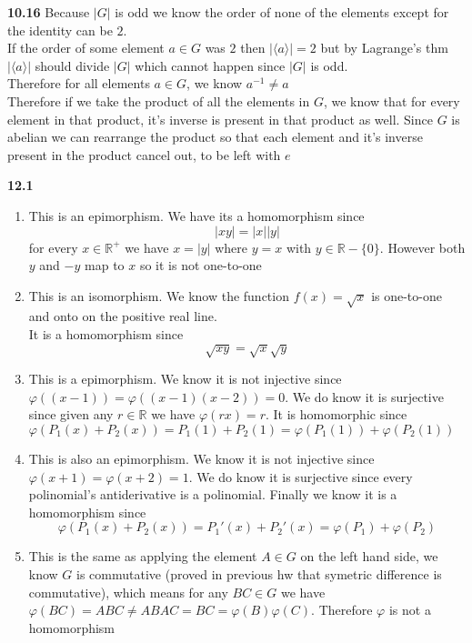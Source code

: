 \documentclass[12pt]{article}
\newenvironment{ques}{\vspace{2 ex}}{\vspace{2 ex}}
\theoremstyle{definition}
\begin{document}
\begin{ques}
	\textbf{10.16}
		Because $|G|$ is odd we know the order of none of the elements
		except for the identity can be $2$.\\
		If the order of some element $a \in G$ was $2$ then $|\langle a
		\rangle| = 2$ but by Lagrange's thm $|\langle a \rangle|$
		should divide $|G|$ which cannot happen since $|G|$ is odd.\\
		Therefore for all elements $a \in G$, we know $a^{-1} \neq a$\\
		Therefore if we take the product of all the elements in $G$, we
		know that for every element in that product, it's inverse is
		present in that product as well. Since $G$ is abelian we can
		rearrange the product so that each element and it's inverse
		present in the product cancel out, to be left with $e$
\end{ques}

\begin{ques}
	\textbf{12.1}
		\begin{enumerate}
			\item
				This is an epimorphism. We have its a homomorphism since
				$$|xy| = |x||y|$$
				for every $x \in \mathbb{R}^+$ we have $x =
				|y|$ where $y = x$ with $y \in \mathbb{R} -
				\{0\}$. However both $y$ and $-y$ map to $x$ so
				it is not one-to-one
			\item
				This is an isomorphism. We know the function
				$f(x) = \sqrt{x}$ is one-to-one and onto on the
				positive real line.\\
				It is a homomorphism since
				$$\sqrt{xy} = \sqrt{x}\sqrt{y}$$
			\item
				This is a epimorphism. We know it is not injective
				since $\varphi((x - 1)) = \varphi((x-1)(x-2)) =
				0$. We do know it is surjective since given any
				$r \in \mathbb{R}$ we have $\varphi( rx) = r$.
				It is homomorphic since $\varphi(P_1(x) +
				P_2(x)) = P_1(1) + P_2(1) = \varphi(P_1(1)) +
				\varphi(P_2(1))$
			\item
				This is also an epimorphism. We know it is not
				injective since $\varphi(x + 1) = \varphi(x +
				2) = 1$. We do know it is surjective since
				every polinomial's antiderivative is a
				polinomial. Finally we know it is a homomorphism since
				$$\varphi(P_1(x) + P_2(x)) = P_1'(x) + P_2'(x)
				= \varphi(P_1) + \varphi(P_2)$$
			\item
				This is the same as applying the element $A \in
				G$ on the left hand side, we know $G$ is
				commutative (proved in previous hw that
				symetric difference is commutative), which
				means for any $BC \in G$ we have $\varphi(BC) =
				ABC \neq ABAC = BC = \varphi(B)\varphi(C)$.
				Therefore $\varphi$ is not a homomorphism
		\end{enumerate}
\end{ques}
\end{document}
